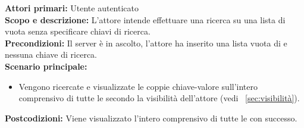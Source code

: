 \documentclass{scalatekids-article}
\begin{document}
\textbf{Attori primari:} Utente autenticato\\
\textbf{Scopo e descrizione:} L'attore intende effettuare una ricerca su una lista di  vuota senza specificare chiavi di ricerca.\\
\textbf{Precondizioni:} Il server è in ascolto, l'attore ha inserito una lista vuota di  e nessuna chiave di ricerca.\\
\textbf{Scenario principale:}
\begin{itemize}
\item Vengono ricercate e visualizzate le coppie chiave-valore sull'intero  comprensivo di tutte le  secondo la visibilità dell'attore (vedi ~\ref{sec:visibilità}).
\end{itemize}
\textbf{Postcodizioni:} Viene visualizzato l'intero  comprensivo di tutte le  con successo.

\end{document}
